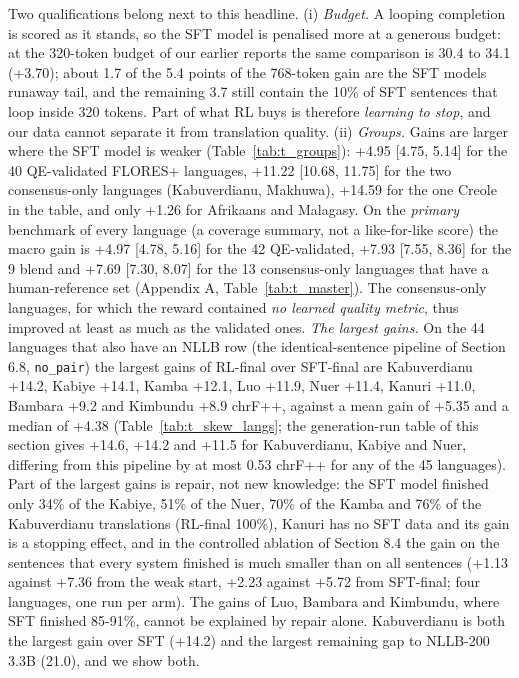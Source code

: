 Two qualifications belong next to this headline. (i) \emph{Budget.} A looping completion is scored as it stands, so the SFT model is penalised more at a generous budget: at the 320-token budget of our earlier reports the same comparison is 30.4 to 34.1 (+3.70); about 1.7 of the 5.4 points of the 768-token gain are the SFT model\textquotesingle s runaway tail, and the remaining 3.7 still contain the 10\% of SFT sentences that loop inside 320 tokens. Part of what RL buys is therefore \emph{learning to stop}, and our data cannot separate it from translation quality. (ii) \emph{Groups.} Gains are larger where the SFT model is weaker (Table~\ref{tab:t_groups}): +4.95 {[}4.75, 5.14{]} for the 40 QE-validated FLORES+ languages, +11.22 {[}10.68, 11.75{]} for the two consensus-only languages (Kabuverdianu, Makhuwa), +14.59 for the one Creole in the table, and only +1.26 for Afrikaans and Malagasy. On the \emph{primary} benchmark of every language (a coverage summary, not a like-for-like score) the macro gain is +4.97 {[}4.78, 5.16{]} for the 42 QE-validated, +7.93 {[}7.55, 8.36{]} for the 9 blend and +7.69 {[}7.30, 8.07{]} for the 13 consensus-only languages that have a human-reference set (Appendix A, Table~\ref{tab:t_master}). The consensus-only languages, for which the reward contained \emph{no learned quality metric}, thus improved at least as much as the validated ones. \emph{The largest gains.} On the 44 languages that also have an NLLB row (the identical-sentence pipeline of Section 6.8, \texttt{no\_pair}) the largest gains of RL-final over SFT-final are Kabuverdianu +14.2, Kabiye +14.1, Kamba +12.1, Luo +11.9, Nuer +11.4, Kanuri +11.0, Bambara +9.2 and Kimbundu +8.9 chrF++, against a mean gain of +5.35 and a median of +4.38 (Table~\ref{tab:t_skew_langs}; the generation-run table of this section gives +14.6, +14.2 and +11.5 for Kabuverdianu, Kabiye and Nuer, differing from this pipeline by at most 0.53 chrF++ for any of the 45 languages). Part of the largest gains is repair, not new knowledge: the SFT model finished only 34\% of the Kabiye, 51\% of the Nuer, 70\% of the Kamba and 76\% of the Kabuverdianu translations (RL-final 100\%), Kanuri has no SFT data and its gain is a stopping effect, and in the controlled ablation of Section 8.4 the gain on the sentences that every system finished is much smaller than on all sentences (+1.13 against +7.36 from the weak start, +2.23 against +5.72 from SFT-final; four languages, one run per arm). The gains of Luo, Bambara and Kimbundu, where SFT finished 85-91\%, cannot be explained by repair alone. Kabuverdianu is both the largest gain over SFT (+14.2) and the largest remaining gap to NLLB-200 3.3B (21.0), and we show both.

